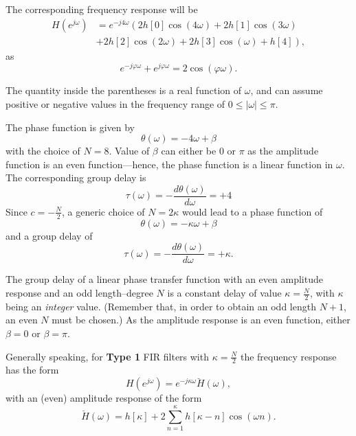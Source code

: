 \documentclass[\documentfontsize, twocolumn]{\classname}
\begin{document}
The corresponding frequency response will be
\begin{align*}
    H(e^{j\omega}) &= e^{-j 4\omega}\left(2h[0]\cos{(4\omega)} + 2h[1]\cos{(3\omega)}\right.\\
    & + \left. 2h[2]\cos{(2\omega)} + 2h[3]\cos{(\omega)} + h[4]\right),
\end{align*}
as
\[
    e^{-j\varphi\omega} + e^{j\varphi\omega} = 2\cos{(\varphi \omega)}.
\]

The quantity inside the parentheses is a real function of $\omega$, and can assume positive or negative values in the frequency range of $0 \leq |\omega| \leq \pi$.

The phase function is given by
\[
    \theta(\omega) = -4\omega + \beta
\]
with the choice of $N=8$. Value of $\beta$ can either be $0$ or $\pi$ as the amplitude function is an even function---hence, the phase function is a linear function in $\omega$. The corresponding group delay is
\[
    \tau(\omega) = -\frac{d\theta(\omega)}{d\omega} = +4
\]
Since $c=-\frac N 2$, a generic choice of $N = 2\kappa$ would lead to a phase function of 
\begin{equation}\label{eqn:linearPhaseTypeIPhaseFunction}
    \theta(\omega) = -\kappa\omega + \beta
\end{equation}
and a group delay of
\begin{equation}\label{eqn:linearPhaseTypeIGroupDelay}
    \tau(\omega) = -\frac{d\theta(\omega)}{d\omega} = +\kappa.
\end{equation}

The group delay of a linear phase transfer function with an even amplitude response and an odd length--degree $N$ is a constant delay of value $\kappa = \frac {N}{2}$, with $\kappa$ being an \emph{integer} value. (Remember that, in order to obtain an odd length $N+1$, an even $N$ must be chosen.) As the amplitude response is an even function, either $\beta=0$ or $\beta=\pi$.

Generally speaking, for \textbf{Type 1} FIR filters with $\kappa = \frac N 2$ the frequency response has the form
\begin{equation}\label{eqn:linearPhaseTypeIResponse}
    H(e^{j\omega}) = e^{-j\kappa\omega}\breve{H}(\omega),
\end{equation}
with an (even) amplitude response of the form
\begin{equation}\label{eqn:linearPhaseTypeIAmplitudeResponse}
    \breve{H}(\omega) = h[\kappa] + 2\sum_{n=1}^\kappa h[\kappa - n]\cos{(\omega n)}.
\end{equation}
\end{document}
